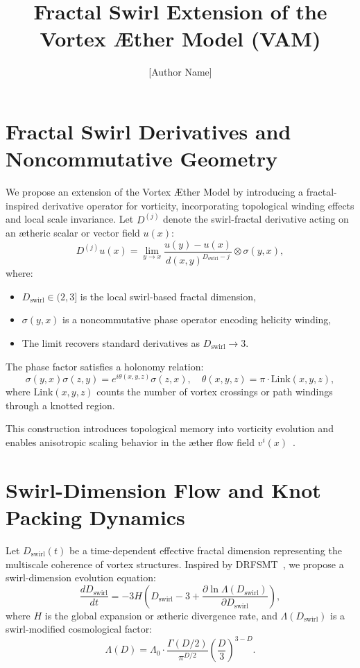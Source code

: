 \documentclass[12pt]{article}
\title{\textbf{Fractal Swirl Extension of the Vortex \AE ther Model (VAM)}}
\author{[Author Name]}
\date{}
\begin{document}
    \maketitle

    \section{Fractal Swirl Derivatives and Noncommutative Geometry}

    We propose an extension of the Vortex \AE ther Model by introducing a fractal-inspired derivative operator for vorticity, incorporating topological winding effects and local scale invariance. Let \( D^{(j)} \) denote the swirl-fractal derivative acting on an ætheric scalar or vector field \( u(x) \):
    \[
        D^{(j)} u(x) = \lim_{y \to x} \frac{u(y) - u(x)}{d(x,y)^{D_\text{swirl} - j}} \otimes \sigma(y,x),
    \]
    where:
    \begin{itemize}
        \item \( D_\text{swirl} \in (2, 3] \) is the local swirl-based fractal dimension,
        \item \( \sigma(y,x) \) is a noncommutative phase operator encoding helicity winding,
        \item The limit recovers standard derivatives as \( D_\text{swirl} \to 3 \).
    \end{itemize}

    The phase factor satisfies a holonomy relation:
    \[
        \sigma(y,x) \sigma(z,y) = e^{i\theta(x,y,z)} \sigma(z,x), \quad \theta(x,y,z) = \pi \cdot \text{Link}(x,y,z),
    \]
    where \( \text{Link}(x,y,z) \) counts the number of vortex crossings or path windings through a knotted region.

    This construction introduces topological memory into vorticity evolution and enables anisotropic scaling behavior in the æther flow field \( v^i(x) \)~\cite{zhou2025drfsmt}.

    \section{Swirl-Dimension Flow and Knot Packing Dynamics}

    Let \( D_\text{swirl}(t) \) be a time-dependent effective fractal dimension representing the multiscale coherence of vortex structures. Inspired by DRFSMT~\cite{zhou2025drfsmt}, we propose a swirl-dimension evolution equation:
    \[
        \frac{d D_\text{swirl}}{dt} = -3H \left( D_\text{swirl} - 3 + \frac{\partial \ln \Lambda(D_\text{swirl})}{\partial D_\text{swirl}} \right),
    \]
    where \( H \) is the global expansion or ætheric divergence rate, and \( \Lambda(D_\text{swirl}) \) is a swirl-modified cosmological factor:
    \[
        \Lambda(D) = \Lambda_0 \cdot \frac{\Gamma(D/2)}{\pi^{D/2}} \left(\frac{D}{3}\right)^{3-D}.
    \]
\end{document}

